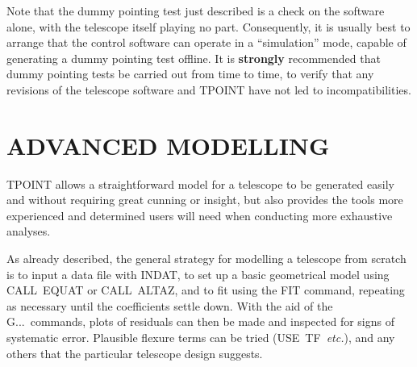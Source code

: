 Note that the dummy pointing test just described
is a check on the software alone, with the telescope itself
playing no part.  Consequently, it is usually best
to arrange that the control software can operate in
a ``simulation'' mode, capable of generating a dummy pointing test
offline.  It is {\bf strongly} recommended that dummy pointing tests
be carried out from time to time, to verify that any
revisions of the telescope software and TPOINT have not
led to incompatibilities.

\section{ADVANCED MODELLING}

TPOINT allows a straightforward model for a telescope to be generated
easily and without requiring great cunning or insight, but also
provides the tools more experienced and determined users will need when
conducting more exhaustive analyses.

As already described, the general strategy for modelling a telescope
from scratch is to input a data file with INDAT, to set up
a basic geometrical model using CALL~EQUAT or CALL~ALTAZ, and
to fit using the FIT command, repeating as necessary
until the coefficients
settle down.  With the aid of the G...\ commands, plots of residuals
can then be made and inspected for signs of systematic error.
Plausible flexure terms can be tried (USE~TF~{\it etc.}), and
any others that the particular telescope design suggests.

